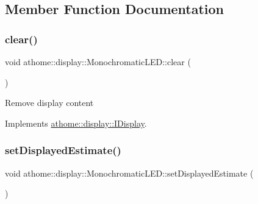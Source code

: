 \subsection{Member Function Documentation}
\mbox{\label{classathome_1_1display_1_1_monochromatic_l_e_d_a81a1470c33e639e916f014e5adbe8707}} 
\subsubsection{\texorpdfstring{clear()}{clear()}}
{\footnotesize\ttfamily void athome\+::display\+::\+Monochromatic\+L\+E\+D\+::clear (\begin{DoxyParamCaption}{ }\end{DoxyParamCaption})\hspace{0.3cm}{\ttfamily [virtual]}}

Remove display content 

Implements \mbox{\hyperlink{classathome_1_1display_1_1_i_display_a0d3add1ce61c96657827fb56d250d9c6}{athome\+::display\+::\+I\+Display}}.

\mbox{\label{classathome_1_1display_1_1_monochromatic_l_e_d_a67a39b7d73305a98fc25705dcc5f3cd0}} 
\subsubsection{\texorpdfstring{set\+Displayed\+Estimate()}{setDisplayedEstimate()}}
{\footnotesize\ttfamily void athome\+::display\+::\+Monochromatic\+L\+E\+D\+::set\+Displayed\+Estimate (\begin{DoxyParamCaption}\item[{\mbox{\hyperlink{classathome_1_1sensor_1_1_i_sensor_aa70bc27a4c17c86caf96cca776541ddf}{sensor\+::\+I\+Sensor\+::\+I\+Sensor\+Scale}}}]{ }\end{DoxyParamCaption})\hspace{0.3cm}{\ttfamily [virtual]}}

